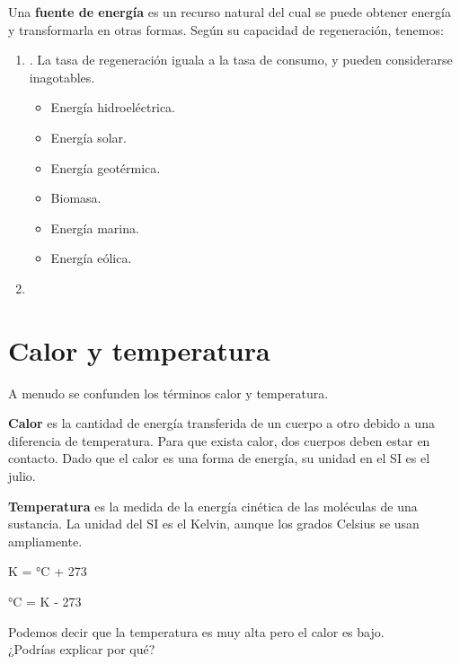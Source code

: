 Una \textbf{fuente de energía} es un recurso natural del cual se puede obtener energía y transformarla en otras formas.
Según su capacidad de regeneración, tenemos:

\begin{enumerate}[label=\numberballmDarkTeal]
\item {}.
La tasa de regeneración iguala a la tasa de consumo, y pueden considerarse inagotables.
\begin{itemize}
    \item Energía hidroeléctrica.
    \item Energía solar.
    \item Energía geotérmica.
    \item Biomasa.
    \item Energía marina.
    \item Energía eólica.
\end{itemize}
\item {}
\end{enumerate}


\section{Calor y temperatura}

A menudo se confunden los términos calor y temperatura.

\textbf{Calor} es la cantidad de energía transferida de un cuerpo a otro debido a una diferencia de temperatura.
Para que exista calor, dos cuerpos deben estar en contacto.
Dado que el calor es una forma de energía, su unidad en el SI es el julio.

\textbf{Temperatura} es la medida de la energía cinética de las moléculas de una sustancia.
La unidad del SI es el Kelvin, aunque los grados Celsius se usan ampliamente.

\begin{centeredequation}
    \unit{\kelvin} = \unit{\degreeCelsius} + 273
\end{centeredequation}
\begin{centeredequation}
    \unit{\degreeCelsius} = \unit{\kelvin} - 273
\end{centeredequation}

\begin{remark}
    Podemos decir que la temperatura es muy alta pero el calor es bajo.\\
    ¿Podrías explicar por qué?
\end{remark}

